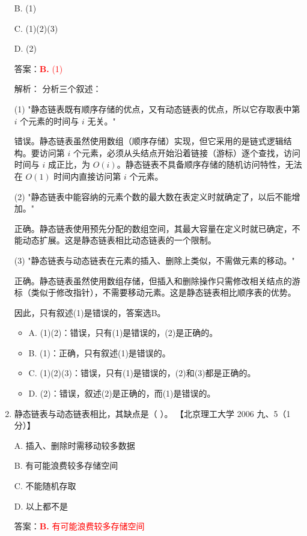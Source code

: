 \documentclass[lang=cn,newtx,10pt,scheme=chinese]{../../../elegantbook}
\begin{document}
\begin{enumerate}
        B. (1)  
    
        C. (1)(2)(3)  
    
        D. (2)  
    
        答案：\textcolor{red}{\textbf{B.} (1)}

        解析：
        分析三个叙述：

        (1) "静态链表既有顺序存储的优点，又有动态链表的优点，所以它存取表中第 $i$ 个元素的时间与 $i$ 无关。"

        错误。静态链表虽然使用数组（顺序存储）实现，但它采用的是链式逻辑结构。要访问第 $i$ 个元素，必须从头结点开始沿着链接（游标）逐个查找，访问时间与 $i$ 成正比，为 $O(i)$。静态链表不具备顺序存储的随机访问特性，无法在 $O(1)$ 时间内直接访问第 $i$ 个元素。

        (2) "静态链表中能容纳的元素个数的最大数在表定义时就确定了，以后不能增加。"

        正确。静态链表使用预先分配的数组空间，其最大容量在定义时就已确定，不能动态扩展。这是静态链表相比动态链表的一个限制。

        (3) "静态链表与动态链表在元素的插入、删除上类似，不需做元素的移动。"

        正确。静态链表虽然使用数组存储，但插入和删除操作只需修改相关结点的游标（类似于修改指针），不需要移动元素。这是静态链表相比顺序表的优势。

        因此，只有叙述(1)是错误的，答案选B。

        \begin{itemize}
            \item A. (1)(2)：错误，只有(1)是错误的，(2)是正确的。
            \item B. (1)：正确，只有叙述(1)是错误的。
            \item C. (1)(2)(3)：错误，只有(1)是错误的，(2)和(3)都是正确的。
            \item D. (2)：错误，叙述(2)是正确的，而(1)是错误的。
        \end{itemize}
    
        \item 静态链表与动态链表相比，其缺点是（ ）。  
        【北京理工大学 2006 九、5（1 分）】  
    
        A. 插入、删除时需移动较多数据  
    
        B. 有可能浪费较多存储空间  
    
        C. 不能随机存取  
    
        D. 以上都不是  

        答案：\textcolor{red}{\textbf{B.} 有可能浪费较多存储空间}


\end{enumerate}
\end{document}
